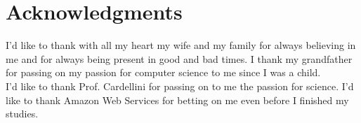 \section*{Acknowledgments}
\label{sec:acknowledgments}

I'd like to thank with all my heart my wife and my family for always believing in me and for always being present in good and bad times.
I thank my grandfather for passing on my passion for computer science to me since I was a child.\\
I'd like to thank Prof. Cardellini for passing on to me the passion for science.
I'd like to thank Amazon Web Services for betting on me even before I finished my studies.